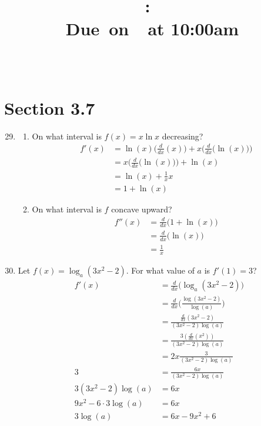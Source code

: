 \documentclass{article}
\title{
    \vspace{2in}
    \textmd{\textbf{\hmwkClass:\ \hmwkTitle}}\\
    \normalsize\vspace{0.1in}\small{Due\ on\ \hmwkDueDate\ at 10:00am}\\
    \vspace{0.1in}\large{\textit{\hmwkClassInstructor\ \hmwkClassTime}}
    \vspace{3in}
}
\author{\hmwkAuthorName}
\date{}
\begin{document}
\maketitle

\pagebreak

\section{Section 3.7}

\begin{enumerate}
\setcounter{enumi}{28}
	\item
		\begin{enumerate}
			\item On what interval is $f(x)=x\ln x$ decreasing?
			$$\begin{align}
				f'(x)&=\ln(x)\Big(\frac{d}{dx}(x)\Big)+x\Big(\frac{d}{dx}\big(\ln(x)\big)\Big)\\
				&=x\Big(\frac{d}{dx}\big(\ln(x)\big)\Big)+\ln(x)\\
				&=\ln(x)+\frac{1}{x}x\\
				&=1+\ln(x)
			\end{align}$$
			\vspace{1cm}
			\item On what interval is $f$ concave upward?
			$$\begin{align}
				f''(x)&=\frac{d}{dx}\big(1+\ln(x)\big) \\
				&=\frac{d}{dx}\big(\ln(x)\big)\\
				&=\frac{1}{x}
			\end{align}$$
			\vspace{1cm}
		\end{enumerate}
\setcounter{enumi}{31}
	\item Let $f(x)=\log_a(3x^2-2)$. For what value of $a$ is $f'(1)=3$?	
	$$\begin{align}
		f'(x)&=\frac{d}{dx}\big(\log_a(3x^2-2)\big)\\
		&=\frac{d}{dx}\Big(\frac{\log(3x^2-2)}{\log(a)}\Big) \\
		&=\frac{\frac{d}{dx}(3x^2-2)}{(3x^2-2)\log(a)}\\
		&=\frac{3(\frac{d}{dx}(x^2))}{(3x^2-2)\log(a)}\\
		&=2x\frac{3}{(3x^2-2)\log(a)}\\
		3&=\frac{6x}{(3x^2-2)\log(a)}\\
		3(3x^2-2)\log(a)&=6x\\
		9x^2-6\cdot3\log(a)&=6x\\
		3\log(a)&=6x-9x^2+6\\

\end{align}$$
\end{enumerate}
\end{document}
